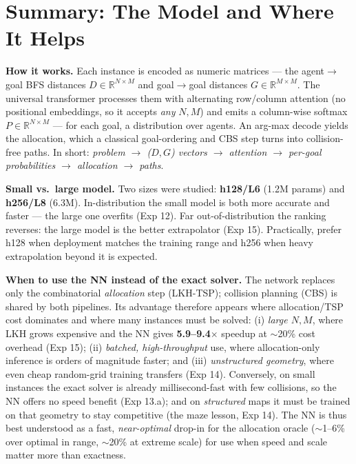\documentclass[11pt,a4paper]{article}
\begin{document}
\section{Summary: The Model and Where It Helps}

\textbf{How it works.} Each instance is encoded as numeric matrices --- the agent$\to$goal BFS
distances $D\in\mathbb{R}^{N\times M}$ and goal$\to$goal distances $G\in\mathbb{R}^{M\times M}$. The
universal transformer processes them with alternating row/column attention (no positional
embeddings, so it accepts \emph{any} $N,M$) and emits a column-wise softmax
$P\in\mathbb{R}^{N\times M}$ --- for each goal, a distribution over agents. An arg-max decode yields
the allocation, which a classical goal-ordering and CBS step turns into collision-free paths. In
short: \emph{problem $\to$ ($D,G$) vectors $\to$ attention $\to$ per-goal probabilities $\to$
allocation $\to$ paths}.

\textbf{Small vs.\ large model.} Two sizes were studied: \textbf{h128/L6} (1.2M params) and
\textbf{h256/L8} (6.3M). In-distribution the small model is both more accurate and faster --- the
large one overfits (Exp 12). Far out-of-distribution the ranking reverses: the large model is the
better extrapolator (Exp 15). Practically, prefer h128 when deployment matches the training range
and h256 when heavy extrapolation beyond it is expected.

\textbf{When to use the NN instead of the exact solver.} The network replaces only the
combinatorial \emph{allocation} step (LKH-TSP); collision planning (CBS) is shared by both
pipelines. Its advantage therefore appears where allocation/TSP cost dominates and where many
instances must be solved: (i) \emph{large $N,M$}, where LKH grows expensive and the NN gives
\textbf{5.9--9.4$\times$} speedup at $\sim$20\% cost overhead (Exp 15); (ii) \emph{batched,
high-throughput} use, where allocation-only inference is orders of magnitude faster; and
(iii) \emph{unstructured geometry}, where even cheap random-grid training transfers (Exp 14).
Conversely, on small instances the exact solver is already millisecond-fast with few collisions, so
the NN offers no speed benefit (Exp 13.a); and on \emph{structured} maps it must be trained on that
geometry to stay competitive (the maze lesson, Exp 14). The NN is thus best understood as a fast,
\emph{near-optimal} drop-in for the allocation oracle ($\sim$1--6\% over optimal in range,
$\sim$20\% at extreme scale) for use when speed and scale matter more than exactness.
\end{document}
